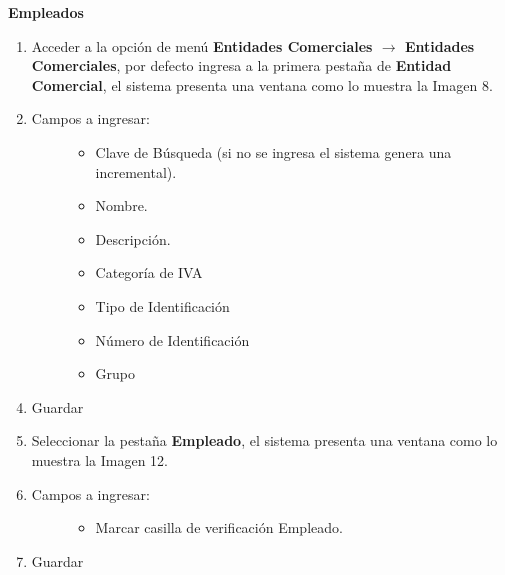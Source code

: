 \documentclass[letterpaper,10pt,spanish]{sphinxmanual}
\begin{document}
\textbf{Empleados}
\begin{enumerate}
\item {} 
Acceder a la opción de menú \textbf{Entidades Comerciales \(\rightarrow\) Entidades Comerciales}, por defecto ingresa a la primera pestaña de \textbf{Entidad Comercial}, el sistema presenta una ventana como lo muestra la Imagen 8.

\item {} \begin{description}
\item[{Campos a ingresar:}] \leavevmode\begin{itemize}
\item {} 
Clave de Búsqueda (si no se ingresa el sistema genera una incremental).

\item {} 
Nombre.

\item {} 
Descripción.

\item {} 
Categoría de IVA

\item {} 
Tipo de Identificación

\item {} 
Número de Identificación

\item {} 
Grupo

\end{itemize}

\end{description}

\end{enumerate}
\begin{enumerate}
\setcounter{enumi}{3}
\item {} 
Guardar

\item {} 
Seleccionar la pestaña \textbf{Empleado}, el sistema presenta una ventana como lo muestra la Imagen 12.

\item {} \begin{description}
\item[{Campos a ingresar:}] \leavevmode\begin{itemize}
\item {} 
Marcar casilla de verificación Empleado.

\end{itemize}

\end{description}

\item {} 
Guardar

\end{enumerate}
\end{document}
